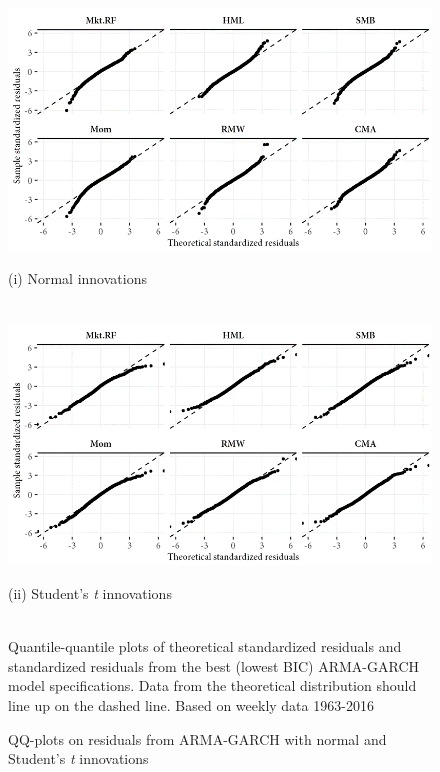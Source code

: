 \begin{figure}[htbpp]
  \caption{QQ-plots on residuals from ARMA-GARCH with normal and Student's \textit{t} innovations}
  \label{fig:qq_norm_std}
  \centering
  \begin{minipage}{\textwidth}
  \includegraphics[scale = 1]{graphics/qq_norm.png}
  \centerline{(i) Normal innovations} \\
  \includegraphics[scale = 1]{graphics/qq_std.png}
  \centerline{(ii) Student's \textit{t} innovations} \\
  \vspace{3mm}
  \footnotesize
  Quantile-quantile plots of theoretical standardized residuals and standardized residuals from the best (lowest BIC) ARMA-GARCH model specifications. Data from the theoretical distribution should line up on the dashed line. Based on weekly data 1963-2016
  \end{minipage}
\end{figure}

